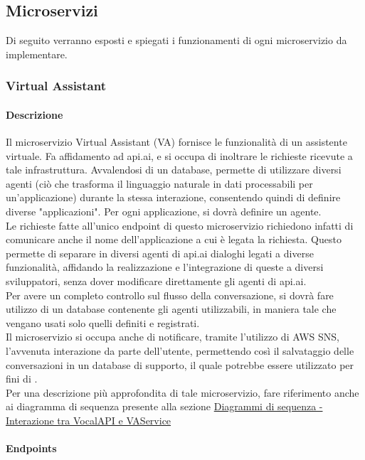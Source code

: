 \subsection{Microservizi}
Di seguito verranno esposti e spiegati i funzionamenti di ogni microservizio da implementare.
\subsubsection{Virtual Assistant}
\paragraph{Descrizione}
Il microservizio Virtual Assistant (VA) fornisce le funzionalità di un assistente virtuale. Fa affidamento ad api.ai, e si occupa di inoltrare le richieste ricevute a tale infrastruttura. Avvalendosi di un database, permette di utilizzare diversi agenti (ciò che trasforma il linguaggio naturale in dati processabili per un'applicazione) durante la stessa interazione, consentendo quindi di definire diverse "applicazioni". Per ogni applicazione, si dovrà definire un agente.\\ Le richieste fatte all'unico endpoint di questo microservizio richiedono infatti di comunicare anche il nome dell'applicazione a cui è legata la richiesta. Questo permette di separare in diversi agenti di api.ai dialoghi legati a diverse funzionalità, affidando la realizzazione e l'integrazione di queste a diversi sviluppatori, senza dover modificare direttamente gli agenti di api.ai. \\
Per avere un completo controllo sul flusso della conversazione, si dovrà fare utilizzo di un database contenente gli agenti utilizzabili, in maniera tale che vengano usati solo quelli definiti e registrati.\\
Il microservizio si occupa anche di notificare, tramite l'utilizzo di AWS SNS, l'avvenuta interazione da parte dell'utente, permettendo così il salvataggio delle conversazioni in un database di supporto, il quale potrebbe essere utilizzato per fini di .\\
Per una descrizione più approfondita di tale microservizio, fare riferimento anche ai diagramma di sequenza presente alla sezione \hyperlink{interazioneVocalAPIVAService}{Diagrammi di sequenza - Interazione tra VocalAPI e VAService}
\paragraph{Endpoints}

